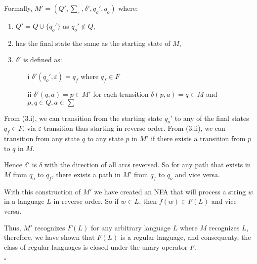 \documentclass[a4paper]{exam}
\begin{document}
\begin{questions}
\begin{solution}
Formally, $ M' = (Q', \sum_\varepsilon, \delta', q_o', q_o) $ where: \vspace*{-3mm}
\begin{enumerate}
  \item $ Q' = Q \cup \{ q_o' \} $ as $ q_o' \notin Q $, \vspace*{-2mm}
  \item has the final state the same as the starting state of $M$, \vspace*{-2mm}
  \item $\delta'$ is defined as: \vspace*{-3mm} \begin{enumerate}
    \item[i] $ \delta'(q_o', \varepsilon) = q_f $ where $ q_f \in F $ \vspace*{-1.5mm}
    \item[ii] $ \delta'(q, a) = p \in M' $ for each transition $ \delta(p, a) = q \in M $ and $ p, q \in Q, a \in \sum $ 
  \end{enumerate}
\end{enumerate}

From (3.i), we can transition from the starting state $q_o'$ to any of the final states $ q_f \in F$, via $\varepsilon$ transition thus starting in reverse order. From (3.ii), we can transition from any state $q$ to any state $p$ in $M'$ if there exists a transition from $p$ to $q$ in $M$.

Hence $ \delta' $ is $\delta$ with the direction of all arcs reversed. So for any path that exists in $M$ from $q_o$ to $q_f$, there exists a path in $M'$ from $q_f$ to $q_o$ and vice versa. 

With this construction of $M'$ we have created an NFA that will process a string $w$ in a language $L$ in reverse order. So if $w \in L$, then $f(w) \in F(L)$ and vice versa.

Thus, $M'$ recognizes $F(L)$ for any arbitrary language $L$ where $M$ recognizes $L$, therefore, we have shown that $F(L)$ is a regular language, and consequenty, the class of regular languages is closed under the unary operator $F$. \vspace*{-5mm}\begin{flushright}
  $\square$
\end{flushright}

\end{solution}  
\end{questions}
\end{document}
